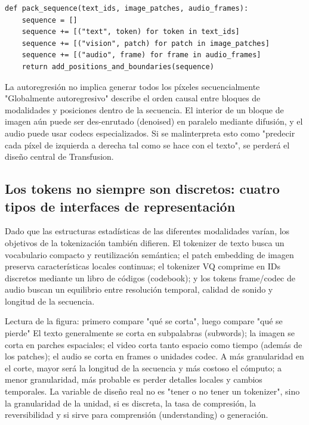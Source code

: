 \begin{lstlisting}[caption={Empaquetar una muestra multimodal en una secuencia con etiquetas de modalidad}]
def pack_sequence(text_ids, image_patches, audio_frames):
    sequence = []
    sequence += [("text", token) for token in text_ids]
    sequence += [("vision", patch) for patch in image_patches]
    sequence += [("audio", frame) for frame in audio_frames]
    return add_positions_and_boundaries(sequence)
\end{lstlisting}

\begin{warningbox}{La autoregresión no implica generar todos los píxeles secuencialmente}
"Globalmente autoregresivo" describe el orden causal entre bloques de modalidades y posiciones dentro de la secuencia. El interior de un bloque de imagen aún puede ser des-enrutado (denoised) en paralelo mediante difusión, y el audio puede usar codecs especializados. Si se malinterpreta esto como "predecir cada píxel de izquierda a derecha tal como se hace con el texto", se perderá el diseño central de Transfusion.
\end{warningbox}

\subsection{Los tokens no siempre son discretos: cuatro tipos de interfaces de representación}

Dado que las estructuras estadísticas de las diferentes modalidades varían, los objetivos de la tokenización también difieren. El tokenizer de texto busca un vocabulario compacto y reutilización semántica; el patch embedding de imagen preserva características locales continuas; el tokenizer VQ comprime en IDs discretos mediante un libro de códigos (codebook); y los tokens frame/codec de audio buscan un equilibrio entre resolución temporal, calidad de sonido y longitud de la secuencia.


\begin{knowledgebox}{Lectura de la figura: primero compare "qué se corta", luego compare "qué se pierde"}
El texto generalmente se corta en subpalabras (subwords); la imagen se corta en parches espaciales; el video corta tanto espacio como tiempo (además de los patches); el audio se corta en frames o unidades codec. A más granularidad en el corte, mayor será la longitud de la secuencia y más costoso el cómputo; a menor granularidad, más probable es perder detalles locales y cambios temporales. La variable de diseño real no es "tener o no tener un tokenizer", sino la granularidad de la unidad, si es discreta, la tasa de compresión, la reversibilidad y si sirve para comprensión (understanding) o generación.
\end{knowledgebox}


